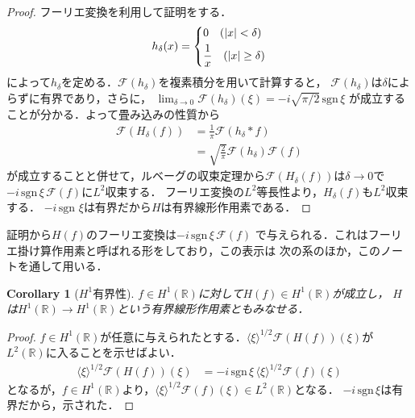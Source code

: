 \documentclass[dvipdfmx,autodetect-engine]{jsarticle}
\newtheorem{corollary}{Corollary}[theorem]
\theoremstyle{remark}
\theoremstyle{definition}
\newcommand{\R}{\mathbb{R}}
\newcommand{\sgn}{\mathrm{sgn} \,}
\begin{document}
\begin{proof}
    フーリエ変換を利用して証明をする．
    \begin{align}
        h_{\delta}(x) = 
        \begin{dcases}
            0\quad (\lvert x \rvert < \delta) \\
            \frac{1}{x} \quad (\lvert x \rvert \geq \delta)
        \end{dcases}
    \end{align}
    によって$h_\delta$を定める．$\mathcal{F}(h_\delta)$を複素積分を用いて計算すると，
    $\mathcal{F}(h_\delta)$は$\delta$によらずに有界であり，さらに，
    $\lim_{\delta \to 0} \mathcal{F}(h_\delta) (\xi) = -i \sqrt{\pi / 2} \, \sgn \xi$
    が成立することが分かる．よって畳み込みの性質から
    \begin{align}
        \mathcal{F}(H_\delta (f)) &= \frac{1}{\pi} \mathcal{F} (h_\delta \ast f) \\
            &= \sqrt{\frac{2}{\pi}} \mathcal{F}(h_\delta) \mathcal{F}(f)
    \end{align}
    が成立することと併せて，ルベーグの収束定理から$\mathcal{F}(H_\delta (f))$は$\delta\to 0$で
    $-i  \, \sgn \xi \, \mathcal{F}(f)$に$L^2$収束する．
    フーリエ変換の$L^2$等長性より，$H_\delta (f)$も$L^2$収束する．
    $-i  \, \sgn \, \xi$は有界だから$H$は有界線形作用素である．
\end{proof}

証明から$H(f)$のフーリエ変換は$-i  \, \sgn \xi \, \mathcal{F}(f)$
で与えられる．これはフーリエ掛け算作用素と呼ばれる形をしており，この表示は
次の系のほか，このノートを通して用いる．

\begin{corollary}[$H^1$有界性]
    $f \in H^1(\R)$に対して$H(f) \in H^1(\R)$が成立し，
    $H$は$H^1(\R) \to H^1(\R)$という有界線形作用素ともみなせる．
\end{corollary}

\begin{proof}
    $f \in H^1(\R)$が任意に与えられたとする．$\langle \xi \rangle^{1/2} \mathcal{F}(H(f))(\xi)$が
    $L^2(\R)$に入ることを示せばよい．
    \begin{align}
        \langle \xi \rangle^{1/2} \mathcal{F}(H(f))(\xi) 
        &= -i \,\sgn \xi \, \langle \xi \rangle^{1/2} \mathcal{F}(f)(\xi)
    \end{align}
    となるが，$f \in H^1(\R)$より，$\langle \xi \rangle^{1/2} \mathcal{F}(f)(\xi) \in L^2(\R)$となる．
    $-i \,\sgn \xi $は有界だから，示された．
\end{proof}
\end{document}
